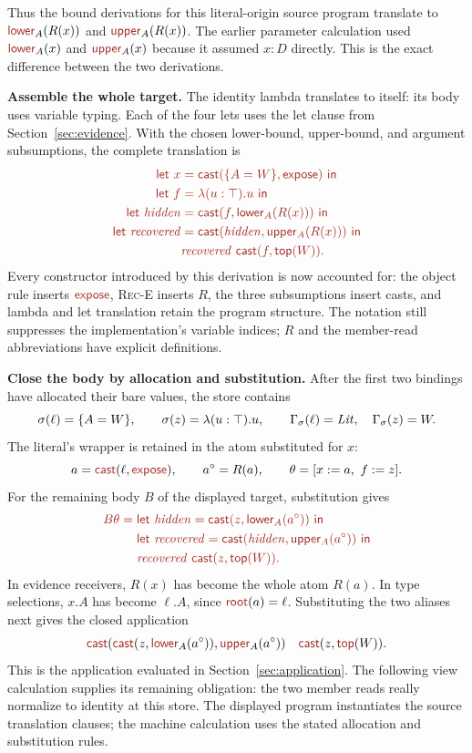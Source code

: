 Thus the bound derivations for this literal-origin source program
translate to $\ev{lower}_A(R(x))$ and $\ev{upper}_A(R(x))$.
The earlier parameter calculation used $\ev{lower}_A(x)$ and
$\ev{upper}_A(x)$ because it assumed $x:D$ directly.
This is the exact difference between the two derivations.

\textbf{Assemble the whole target.}
The identity lambda translates to itself: its body uses variable typing.
Each of the four lets uses the let clause from
Section~\ref{sec:evidence}. With the chosen lower-bound, upper-bound,
and argument subsumptions, the complete translation is
\[
\tgt{\begin{aligned}
 \ev{let}\ x&=\cast{\{A=W\}}{\ev{expose}}\ \ev{in}\\
 \ev{let}\ f&=\lambda(u:\top).u\ \ev{in}\\
 \ev{let}\ \ty{hidden}&=\cast{f}{\ev{lower}_A(R(x))}\ \ev{in}\\
 \ev{let}\ \ty{recovered}
   &=\cast{\ty{hidden}}{\ev{upper}_A(R(x))}\ \ev{in}\\
 &\ty{recovered}\ \cast{f}{\ev{top}(W)}.
\end{aligned}}
\]
Every constructor introduced by this derivation is now accounted for:
the object rule inserts $\ev{expose}$, \textsc{Rec-E} inserts $R$,
the three subsumptions insert casts, and lambda and let translation
retain the program structure. The notation still suppresses the
implementation's variable indices; $R$ and the member-read abbreviations
have explicit definitions.

\textbf{Close the body by allocation and substitution.}
After the first two bindings have allocated their bare values, the store
contains
\[
 \sigma(\ell)=\{A=W\},\qquad
 \sigma(z)=\lambda(u:\top).u,
 \qquad \Gamma_\sigma(\ell)=\mathit{Lit},\quad
        \Gamma_\sigma(z)=W.
\]
The literal's wrapper is retained in the atom substituted for $x$:
\[
 a=\cast{\ell}{\ev{expose}},\qquad a^\circ=R(a),\qquad
 \theta=[x:=a,\ f:=z].
\]
For the remaining body $B$ of the displayed target, substitution gives
\[
\tgt{\begin{aligned}
 B\theta={}&
 \ev{let}\ \ty{hidden}=\cast{z}{\ev{lower}_A(a^\circ)}\ \ev{in}\\
 &\ev{let}\ \ty{recovered}
     =\cast{\ty{hidden}}{\ev{upper}_A(a^\circ)}\ \ev{in}\\
 &\ty{recovered}\ \cast{z}{\ev{top}(W)}.
\end{aligned}}
\]
In evidence receivers, $R(x)$ has become the whole atom $R(a)$.
In type selections, $x.A$ has become $\ell.A$, since
$\ev{root}(a)=\ell$. Substituting the two aliases next gives the
closed application
\[
 \cast{\cast{z}{\ev{lower}_A(a^\circ)}}{\ev{upper}_A(a^\circ)}
 \quad \cast{z}{\ev{top}(W)}.
\]
This is the application evaluated in Section~\ref{sec:application}.
The following view calculation supplies its remaining obligation:
the two member reads really normalize to identity at this store.
The displayed program instantiates the source translation clauses;
the machine calculation uses the stated allocation and substitution rules.
